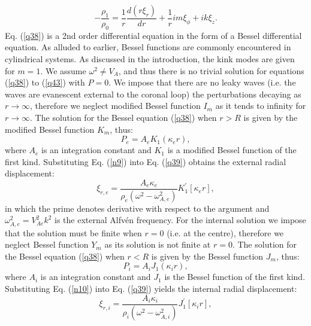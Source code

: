\documentclass[12pt,a4paper,twoside]{article}
\newcommand{\Alfven}{Alfv\'{e}n }
\begin{document}
\begin{equation}\label{q43}
 -\frac{\rho_1}{\rho_0} = \frac{1}{r} \frac{d(r \xi_r)}{dr}+ \frac{1}{r}im \xi_{\phi} + ik \xi_z .
\end{equation}
Eq. (\ref{q38}) is a 2nd order differential equation in the form of a Bessel differential equation. As alluded to earlier, Bessel functions are commonly encountered in cylindrical systems. As discussed in the introduction, the kink modes are given for $m=1$. We assume $\omega^2 \neq V_A$, and thus there is no trivial solution for equations (\ref{q38}) to (\ref{q43}) with $P=0$. We impose that there are no leaky waves (i.e. the waves are evanescent external to the coronal loop) the perturbations decaying as $r \rightarrow \infty$, therefore we neglect modified Bessel function $I_m$ as it tends to infinity for $r \rightarrow \infty$. The solution for the Bessel equation (\ref{q38}) when $r > R$ is given by the modified Bessel function $K_m$, thus:
\begin{equation}\label{n9}
P_e = A_e K_1 (\kappa_e r) ,
\end{equation} 
where $A_e$ is an integration constant and $K_1$ is a modified Bessel function of the first kind. Substituting Eq. (\ref{n9}) into Eq. (\ref{q39}) obtains the external radial displacement:
\begin{equation}
\xi_{r,e} = \frac{A_e \kappa_e}{\rho_e (\omega^2-\omega^2_{A,e})} K^{\prime}_1[\kappa_e r] ,
\end{equation}
in which the prime denotes derivative with respect to the argument and $\omega^2_{A,e} = V^2_{Ae} k^2$ is the external \Alfven frequency. For the internal solution we impose that the solution must be finite when $r=0$ (i.e. at the centre), therefore we neglect Bessel function $Y_m$ as its solution is not finite at $r=0$. The solution for the Bessel equation (\ref{q38}) when $r<R$ is given by the Bessel function $J_m$, thus:  
\begin{equation}\label{n10}
P_i = A_i J_1(\kappa_i r) ,
\end{equation}  
where $A_i$ is an integration constant and $J_1$ is the Bessel function of the first kind. Substituting Eq. (\ref{n10}) into Eq. (\ref{q39}) yields the internal radial displacement:
\begin{equation}
\xi_{r,i} = \frac{A_i \kappa_i}{\rho_i(\omega^2-\omega_{A,i}^2)}J^{\prime}_1\left[ \kappa_i r \right] , 
\end{equation}   
\end{document}
